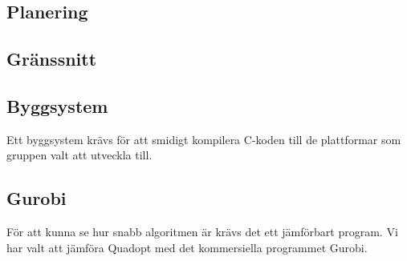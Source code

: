 \subsection{Planering}
\begin{LIPSaktivitetslista}
\end{LIPSaktivitetslista}

\subsection{Gränssnitt}

\begin{LIPSaktivitetslista}

\end{LIPSaktivitetslista}

\subsection{Byggsystem}
Ett byggsystem krävs för att smidigt kompilera C-koden till de plattformar som gruppen valt att utveckla till.
\begin{LIPSaktivitetslista}
\end{LIPSaktivitetslista}

\subsection{Gurobi}
För att kunna se hur snabb algoritmen är krävs det ett jämförbart program. Vi har valt att jämföra Quadopt med det kommersiella programmet Gurobi.
\begin{LIPSaktivitetslista}

\end{LIPSaktivitetslista}
